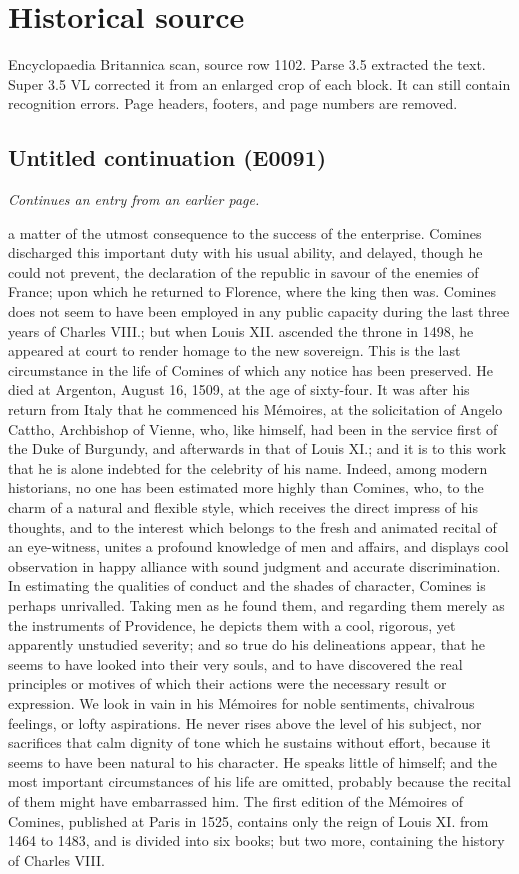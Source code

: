 \documentclass{article}
\begin{document}
\section*{Historical source}
Encyclopaedia Britannica scan, source row 1102. Parse 3.5 extracted the text. Super 3.5 VL corrected it from an enlarged crop of each block. It can still contain recognition errors.
Page headers, footers, and page numbers are removed.

\subsection*{Untitled continuation (E0091)}
\textit{Continues an entry from an earlier page.}

a matter of the utmost consequence to the success of the enterprise. Comines discharged this important duty with his usual ability, and delayed, though he could not prevent, the declaration of the republic in savour of the enemies of France; upon which he returned to Florence, where the king then was. Comines does not seem to have been employed in any public capacity during the last three years of Charles VIII.; but when Louis XII. ascended the throne in 1498, he appeared at court to render homage to the new sovereign. This is the last circumstance in the life of Comines of which any notice has been preserved. He died at Argenton, August 16, 1509, at the age of sixty-four. It was after his return from Italy that he commenced his Mémoires, at the solicitation of Angelo Cattho, Archbishop of Vienne, who, like himself, had been in the service first of the Duke of Burgundy, and afterwards in that of Louis XI.; and it is to this work that he is alone indebted for the celebrity of his name. Indeed, among modern historians, no one has been estimated more highly than Comines, who, to the charm of a natural and flexible style, which receives the direct impress of his thoughts, and to the interest which belongs to the fresh and animated recital of an eye-witness, unites a profound knowledge of men and affairs, and displays cool observation in happy alliance with sound judgment and accurate discrimination. In estimating the qualities of conduct and the shades of character, Comines is perhaps unrivalled. Taking men as he found them, and regarding them merely as the instruments of Providence, he depicts them with a cool, rigorous, yet apparently unstudied severity; and so true do his delineations appear, that he seems to have looked into their very souls, and to have discovered the real principles or motives of which their actions were the necessary result or expression. We look in vain in his Mémoires for noble sentiments, chivalrous feelings, or lofty aspirations. He never rises above the level of his subject, nor sacrifices that calm dignity of tone which he sustains without effort, because it seems to have been natural to his character. He speaks little of himself; and the most important circumstances of his life are omitted, probably because the recital of them might have embarrassed him. The first edition of the Mémoires of Comines, published at Paris in 1525, contains only the reign of Louis XI. from 1464 to 1483, and is divided into six books; but two more, containing the history of Charles VIII. 
\end{document}
